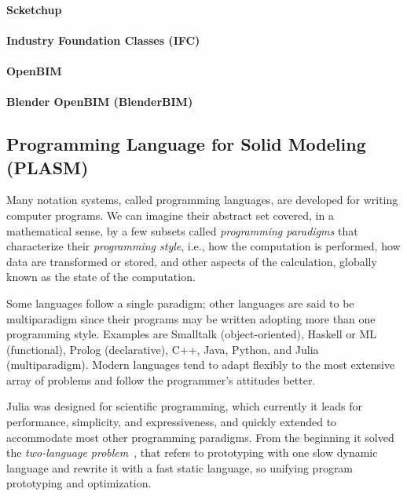 \paragraph{Scketchup}


\paragraph{Industry Foundation Classes (IFC)}


\paragraph{OpenBIM}


\paragraph{Blender OpenBIM (BlenderBIM)}



\subsection{Programming Language for Solid Modeling (PLASM)}
\label{subsec:2:style}

Many notation systems, called programming languages, are developed for writing computer programs. We can imagine their abstract set covered, in a mathematical sense, by a few subsets called \emph{programming paradigms} that characterize their \emph{programming style}, i.e., how the computation is performed, how data are transformed or stored, and other aspects of the calculation, globally known as the state of the computation.

Some languages follow a single paradigm; other languages are said to be multiparadigm since their programs may be written adopting more than one programming style. Examples are Smalltalk (object-oriented), Haskell or ML (functional), Prolog (declarative), C++, Java, Python, and Julia (multiparadigm). Modern languages tend to adapt flexibly to the most extensive array of problems and follow the programmer’s attitudes better.

Julia was designed for scientific programming, which currently it leads for performance, simplicity, and expressiveness, and quickly extended to accommodate most other programming paradigms. From the beginning it solved the \emph{two-language problem}~\cite{BEKS14}, that refers to prototyping with one slow dynamic language and rewrite it with a fast static language, so unifying program prototyping and optimization.

